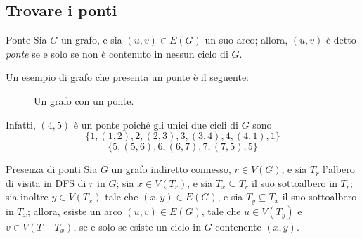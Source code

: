 \documentclass[a4paper, 12pt]{report}
\begin{document}
    \subsection{Trovare i ponti}

    \begin{frameddefn}{Ponte}
        Sia $G$ un grafo, e sia $(u, v) \in E(G)$ un suo arco; allora, $(u, v)$ è detto \textit{ponte} se e solo se non è contenuto in nessun ciclo di $G$.
    \end{frameddefn}

    \begin{example}[Ponte]
        Un esempio di grafo che presenta un ponte è il seguente:

        \begin{figure}[H]
            \centering
            \caption{Un grafo con un ponte.}
        \end{figure}

        Infatti, $(4, 5)$ è un ponte poiché gli unici due cicli di $G$ sono $$\{1, (1, 2), 2, (2, 3), 3, (3, 4), 4, (4, 1), 1\}$$ $$\{5, (5, 6), 6, (6, 7), 7, (7, 5), 5\}$$
    \end{example}

    \begin{framedthm}{Presenza di ponti}
        \label{teorema dei ponti}
        Sia $G$ un grafo indiretto connesso, $r \in V(G)$, e sia $T_r$ l'albero di visita in DFS di $r$ in $G$; sia $x \in V(T_r)$, e sia $T_x \subseteq T_r$ il suo sottoalbero in $T_r$; sia inoltre $y \in V(T_x)$ tale che $(x, y) \in E(G)$, e sia $T_y \subseteq T_x$ il suo sottoalbero in $T_x$; allora, esiste un arco $(u, v) \in E(G)$, tale che $u \in V(T_y)$ e $v \in V(T - T_x)$, se e solo se esiste un ciclo in $G$ contenente $(x, y)$.
    \end{framedthm}
\end{document}
